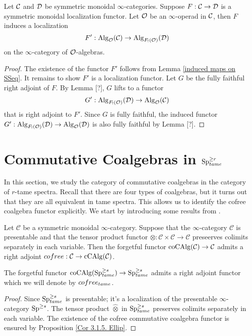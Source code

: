 \begin{proposition}
\label{Lifting localization to algebra category}
Let ${\mathcal{C}}$ and ${\mathcal{D}}$ be symmetric monoidal $\infty$-categories. 
Suppose $F:{\mathcal{C}} \to {\mathcal{D}}$ is a symmetric monoidal localization functor.
Let ${\mathcal{O}}$ be an $\infty$-operad in ${\mathcal{C}}$, then $F$ induces a localization 
$$
F': \operatorname{Alg}_{{\mathcal{O}}}({\mathcal{C}}) \to  \operatorname{Alg}_{F_{!}({\mathcal{O}})}({\mathcal{D}})
$$
on the $\infty$-category of ${\mathcal{O}}$-algebras.
\end{proposition}
\begin{proof}
	The existence of the functor $F'$ follows from Lemma \ref{induced maps on SSeq}. It remains to show $F'$ is a localization functor. Let $G$ be the fully faithful right adjoint of $F$. By Lemma [?], $G$ lifts to a functor 
	$$
	G': \operatorname{Alg}_{F_{!}({\mathcal{O}})}({\mathcal{D}})
	\to 
	\operatorname{Alg}_{{\mathcal{O}}}({\mathcal{C}})
	$$
	that is right adjoint to $F'$. 
	Since $G$ is fully faithful, the induced functor $G':\operatorname{Alg}_{F_{!}({\mathcal{O}})}({\mathcal{D}})	
	\to 
	\operatorname{Alg}_{{\mathcal{O}}}({\mathcal{D}})$ is also fully faithful by Lemma [?].  
	
\end{proof}




\section{Commutative Coalgebras in $\operatorname{Sp}^{\geq r}_{tame}$}
\label{Commutative coalgebras in tame spectra}

In this section, we study the category of commutative coalgebras in the category of $r$-tame spectra. 
Recall that there are four types of coalgebras, but it turns out that they are all equivalent in tame spectra. This allows us to identify the cofree coalgebra functor explicitly.
We start by introducing some results from \cite{LurieEllipticI}.

\begin{proposition}
\label{Cor 3.1.5. Ellip}
\cite[Corollary 3.1.5]{LurieEllipticI}
	Let $\mathcal{C}$ be a symmetric monoidal $\infty$-category. Suppose that the $\infty$-category $\mathcal{C}$ is presentable and that the tensor product functor $\otimes: \mathcal{C} \times \mathcal{C} \rightarrow \mathcal{C}$ preseerves colimits separately in each variable. Then the forgetful functor $\operatorname{coCAlg}(\mathcal{C}) \rightarrow \mathcal{C}$ admits a right adjoint $cofree: \mathcal{C} \rightarrow \operatorname{cCAlg}(\mathcal{C})$.
\end{proposition}


\begin{corollary}
The forgetful functor $\operatorname{coCAlg}(\operatorname{Sp}_{tame}^{\geq s})\to \operatorname{Sp}^{\geq s}_{tame}$ admits a right adjoint functor which we will denote by $cofree_{tame}$.
\end{corollary}
\begin{proof}
	Since $\operatorname{Sp}^{\geq s}_{tame}$ is presentable; it's a localization of the presentable $\infty$-category $\operatorname{Sp}^{\geq s}$. The tensor product $\hat{\otimes}$ in $\operatorname{Sp}_{tame}^{\geq s}$ preserves colimits separately in each variable. The existence of the cofree commutative coalgebra functor is ensured by Proposition \ref{Cor 3.1.5. Ellip}.
\end{proof}

